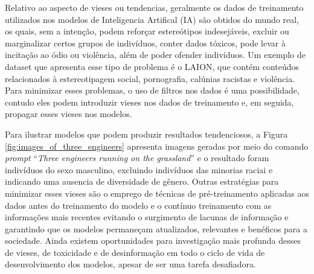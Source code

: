 Relativo ao aspecto de vieses ou tendencias, geralmente os dados de treinamento 
utilizados nos modelos de Inteligencia Artifical (IA) são obtidos do mundo real,
os quais, sem a intenção, podem reforçar estereótipos indesejáveis, excluir ou marginalizar certos grupos de indivíduos, 
conter dados tóxicos, pode levar à incitação ao ódio ou violência, além de poder ofender indivíduos. 
Um exemplo de dataset que apresenta esse tipo de problema é o LAION, que contém conteúdos relacionados à estereotipagem social,
pornografia, calúnias racistas e violência. Para minimizar esses problemas, o uso de filtros nos dados é uma possibilidade,
contudo eles podem introduzir vieses nos dados de treinamento e, em seguida, propagar esses vieses nos modelos.

Para ilustrar modelos que podem produzir resultados tendenciosos, a Figura \ref{fig:images_of_three_engineers} apresenta 
imagens geradas por meio do comando \textit{prompt} ``\textit{Three engineers running on the grassland}'' 
e o resultado foram indivíduos do sexo masculino, excluindo indivíduos das minorias raciai e
indicando uma ausencia de diversidade de gênero.
Outras estratégias para minimizar esses vieses são o emprego de técnicas de pré-treinamento aplicadas aos dados antes do treinamento do 
modelo e o contínuo treinamento com as informações mais recentes evitando o 
surgimento de lacunas de informação e garantindo que os modelos permaneçam atualizados, relevantes 
e benéficos para a sociedade. Ainda existem oportunidades para investigação mais profunda desses de vieses, de
toxicidade e de desinformação em todo o ciclo de vida de desenvolvimento dos modelos, 
apesar de ser uma tarefa desafiadora.


